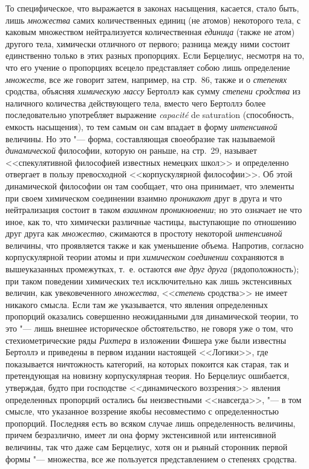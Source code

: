 То специфическое, что выражается в законах насыщения, касается, стало быть,
лишь {\em множества} самих количественных единиц (не
атомов) некоторого тела, с каковым множеством нейтрализуется количественная
{\em единица} (также не атом) другого тела, химически
отличного от первого; разница между ними состоит единственно только в этих
разных пропорциях. Если Берцелиус, несмотря на то, что его учение о
пропорциях всецело представляет собою лишь определение
{\em множеств}, все же говорит затем, например, на стр.~86,
также и о {\em степенях} сродства, объясняя
{\em химическую массу} Бертоллэ как сумму
{\em степени сродства} из наличного количества
действующего тела, вместо чего Бертоллэ более последовательно употребляет
выражение {\em capacité} de saturation (способность,
емкость насыщения), то тем самым он сам впадает в форму
{\em интенсивной} величины. Но это "--- форма,
составляющая своеобразие так называемой
{\em динамической} философии, которую он раньше, на
стр.~29, называет <<спекулятивной философией известных немецких школ>> и
определенно отвергает в пользу превосходной <<корпускулярной философии>>. Об
этой динамической философии он там сообщает, что она принимает, что
элементы при своем химическом соединении взаимно
{\em проникают} друг в друга и что нейтрализация
состоит в таком {\em взаимном проникновении}; но это
означает не что иное, как то, что химически различные частицы, выступающие
по отношению друг друга как {\em множество}, сжимаются
в простоту некоторой {\em интенсивной} величины, что
проявляется также и как уменьшение объема. Напротив, согласно
корпускулярной теории атомы и при {\em химическом
соединении} сохраняются в вышеуказанных промежутках, т.~е. остаются
{\em вне друг друга} (рядоположность); при таком
поведении химических тел исключительно как лишь экстенсивных величин, как
увековеченного {\em множества},
<<{\em степень} сродства>> не имеет никакого смысла. Если
там же указывается, что явления определенных пропорций оказались совершенно
неожиданными для динамической теории, то это "--- лишь внешнее историческое
обстоятельство, не говоря уже о том, что стехиометрические ряды
{\em Рихтера} в изложении Фишера уже были известны
Бертоллэ и приведены в первом издании настоящей <<Логики>>, где показывается
ничтожность категорий, на которых покоится как старая, так и претендующая на
новизну корпускулярная теория. Но Берцелиус ошибается, утверждая, будто при
господстве <<динамического воззрения>> явления определенных пропорций
остались бы неизвестными <<навсегда>>, "--- в том смысле, что указанное
воззрение якобы несовместимо с определенностью пропорций. Последняя есть во
всяком случае лишь определенность величины, причем безразлично, имеет ли
она форму экстенсивной или интенсивной величины, так что даже сам
Берцелиус, хотя он и рьяный сторонник первой формы "--- множества, все же
пользуется представлением о степенях сродства.

